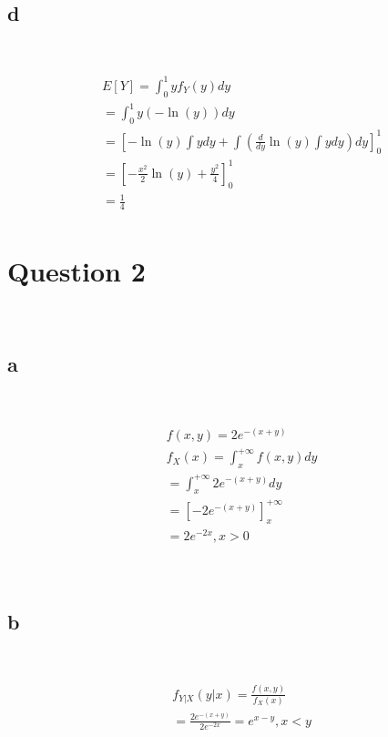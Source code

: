 \documentclass{article}
\begin{document}
~

\subsection*{d}

~

\begin{align*}
    &E[Y]=\int_{0}^{1}yf_Y(y)dy\\
    &=\int_{0}^{1}y(-\ln(y))dy\\
    &=\left[-\ln (y)\int ydy+\int(\frac{d}{dy}\ln(y)\int ydy )dy\right]^{1}_{0}\\
    &=\left[-\frac{x^2}{2}\ln(y)+\frac{y^2}{4}\right]^{1}_{0}\\
    &=\frac{1}{4}\\
\end{align*}

\newpage

\section*{Question 2}

~

\subsection*{a}

~

\begin{align*}
    &f(x,y)=2e^{-(x+y)}\\
    &f_X(x)=\int_{x}^{+\infty}f(x,y)dy\\
    &=\int_{x}^{+\infty}2e^{-(x+y)}dy\\
    &=\left[-2e^{-(x+y)}\right]^{+\infty}_{x}\\
    &=2e^{-2x},x>0\\
\end{align*}

~

\subsection*{b}

~

\begin{align*}
    &f_{Y|X}(y|x)=\frac{f(x,y)}{f_X(x)}\\
    &=\frac{2e^{-(x+y)}}{2e^{-2x}}=e^{x-y},x<y\\
\end{align*}
\end{document}
